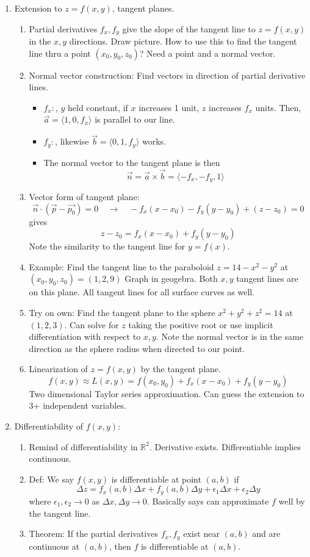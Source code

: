 \documentclass{article}
\begin{document}
\begin{enumerate}
\item Extension to $z=f(x,y)$, tangent planes.
\begin{enumerate}
\item Partial derivatives $f_x, f_y$ give the slope of the tangent line to $z=f(x,y)$ in the $x, y$ directions. Draw picture. How to use this to find the tangent line thru a point $(x_0, y_0, z_0)$? Need a point and a normal vector. 
\item Normal vector construction: Find vectors in direction of partial derivative lines.
\begin{itemize}
\item $f_x:$, $y$ held constant, if $x$ increases 1 unit, $z$ increases $f_x$ units. Then, $\vec{a}=\langle 1,0,f_x \rangle$ is parallel to our line.
\item $f_y:$, likewise $\vec{b}=\langle 0,1,f_y \rangle$ works.
\item The normal vector to the tangent plane is then
\[
\vec{n} = \vec{a} \times \vec{b} = \langle -f_x, -f_y, 1\rangle
\]
\end{itemize}
\item Vector form of tangent plane:
\[
\vec{n} \cdot (\vec{p}-\vec{p_0}) = 0 \quad \rightarrow \quad -f_x(x-x_0)-f_y(y-y_0)+(z-z_0)=0
\]
gives
\[
z-z_0=f_x(x-x_0)+f_y(y-y_0)
\]
Note the similarity to the tangent line for $y=f(x)$.
\item Example: Find the tangent line to the paraboloid $z=14-x^2-y^2$ at $(x_0,y_0,z_0)=(1,2,9)$ Graph in geogebra. Both $x,y$ tangent lines are on this plane. All tangent lines for all surface curves as well.
\item Try on own: Find the tangent plane to the sphere $x^2+y^2+z^2=14$ at $(1,2,3)$. Can solve for $z$ taking the positive root or use implicit differentiation with respect to $x,y$. Note the normal vector is in the same direction as the sphere radius when directed to our point.
\item Linearization of $z=f(x,y)$ by the tangent plane.
\[
f(x,y) \approx L(x,y) = f(x_0, y_0)+f_x(x-x_0)+f_y(y-y_0)
\]
Two dimensional Taylor series approximation. Can guess the extension to 3+ independent variables. 
\end{enumerate}

\item Differentiability of $f(x,y)$:
\begin{enumerate}
\item Remind of differentiability in $\mathbb{R}^2$. Derivative exists. Differentiable implies continuous. 
\item Def: We say $f(x,y)$ is differentiable at point $(a,b)$ if 
\[
\Delta z = f_x(a,b)\Delta x + f_y(a,b) \Delta y +\epsilon_1 \Delta x + \epsilon_2 \Delta y
\]
where $\epsilon_1,\epsilon_2 \rightarrow 0$ as $\Delta x,\Delta y \rightarrow 0$. Basically says can approximate $f$ well by the tangent line.
\item Theorem: If the partial derivatives $f_x,f_y$ exist near $(a,b)$ and are continuous at $(a,b)$, then $f$ is differentiable at $(a,b)$.
\end{enumerate}


\end{enumerate}
\end{document}
